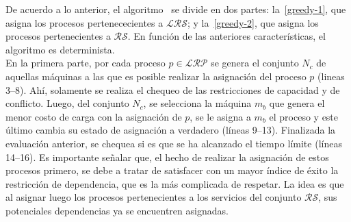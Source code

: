 \documentclass[../informe2.tex]{subfiles}
\begin{document}
De acuerdo a lo anterior, el algoritmo \greedy\ se divide en dos partes: la~\ref{greedy-1}, que asigna los procesos pertenececientes a $\mathcal{LRS}$; y la~\ref{greedy-2}, que asigna los procesos pertenecientes a $\mathcal{RS}$. En función de las anteriores características, el algoritmo es determinista.\\
En la primera parte, por cada proceso $p \in \mathcal{LRP}$ se genera el conjunto $N_c$ de aquellas máquinas a las que es posible realizar la asignación del proceso $p$ (lineas 3--8). Ahí, solamente se realiza el chequeo de las restricciones de capacidad y de conflicto. Luego, del conjunto $N_c$, se selecciona la máquina $m_b$ que genera el menor costo de carga con la asignación de $p$, se le asigna a $m_b$ el proceso y este último cambia su estado de asignación a verdadero (líneas 9--13). Finalizada la evaluación anterior, se chequea si es que se ha alcanzado el tiempo límite (líneas 14--16). Es importante señalar que, el hecho de realizar la asignación de estos procesos primero, se debe a tratar de satisfacer con un mayor índice de éxito la restricción de dependencia, que es la más complicada de respetar. La idea es que al asignar luego los procesos pertenecientes a los servicios del conjunto $\mathcal{RS}$, sus potenciales dependencias ya se encuentren asignadas.
\end{document}

